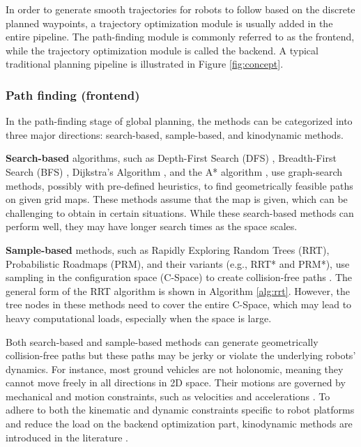 In order to generate smooth trajectories for robots to follow based on the discrete planned waypoints, a trajectory optimization module is usually added in the entire pipeline. The path-finding module is commonly referred to as the frontend, while the trajectory optimization module is called the backend. A typical traditional planning pipeline is illustrated in Figure \ref{fig:concept}.

\subsubsection{Path finding (frontend)}
In the path-finding stage of global planning, the methods can be categorized into three major directions: search-based, sample-based, and kinodynamic methods.

\textbf{Search-based} algorithms, such as Depth-First Search (DFS) \cite{cormen-2009}, Breadth-First Search (BFS) \cite{cormen-2009}, Dijkstra's Algorithm \cite{dijkstra-1959}, and the A* algorithm \cite{hart-1968}, use graph-search methods, possibly with pre-defined heuristics, to find geometrically feasible paths on given grid maps. These methods assume that the map is given, which can be challenging to obtain in certain situations. While these search-based methods can perform well, they may have longer search times as the space scales.

\textbf{Sample-based} methods, such as Rapidly Exploring Random Trees (RRT), Probabilistic Roadmaps (PRM), and their variants (e.g., RRT* and PRM*), use sampling in the configuration space (C-Space) to create collision-free paths \cite{lavalle-1998,kavraki-1996,karaman-2011}. The general form of the RRT algorithm is shown in Algorithm \ref{alg:rrt}. However, the tree nodes in these methods need to cover the entire C-Space, which may lead to heavy computational loads, especially when the space is large.

Both search-based and sample-based methods can generate geometrically collision-free paths but these paths may be jerky or violate the underlying robots' dynamics. For instance, most ground vehicles are not holonomic, meaning they cannot move freely in all directions in 2D space. Their motions are governed by mechanical and motion constraints, such as velocities and accelerations \cite{lavalle-2006}. To adhere to both the kinematic and dynamic constraints specific to robot platforms and reduce the load on the backend optimization part, kinodynamic methods are introduced in the literature \cite{donald-1993}. 

